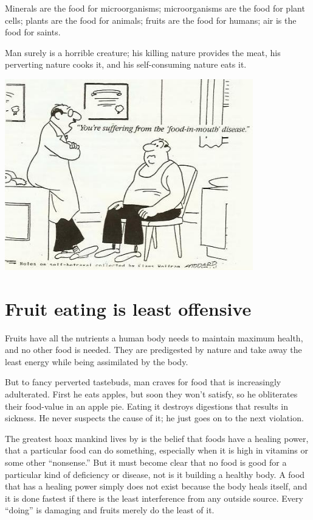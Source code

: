 \documentclass[12pt,letterpaper]{article}
\begin{document}
Minerals are the food for microorganisms; microorganisms are the food
for plant cells; plants are the food for animals; fruits are the food
for humans; air is the food for saints.

Man surely is a horrible creature; his killing nature provides the
meat, his perverting nature cooks it, and his self-consuming nature
eats it.




\includegraphics[width=4.25in,bb=0 0 470 359]{p7.jpg}





\section{Fruit eating is least offensive}

Fruits have all the nutrients a human body needs to maintain maximum
health, and no other food is needed. They are predigested by nature
and take away the least energy while being assimilated by the body.

But to fancy perverted tastebuds, man craves for food that is
increasingly adulterated. First he eats apples, but soon they won't
satisfy, so he obliterates their food-value in an apple pie. Eating it
destroys digestions that results in sickness. He never suspects the
cause of it; he just goes on to the next violation.

The greatest hoax mankind lives by is the belief that foods have a
healing power, that a particular food can do something, especially
when it is high in vitamins or some other ``nonsense.'' But it must
become clear that no food is good for a particular kind of deficiency
or disease, not is it building a healthy body. A food that has a
healing power simply does not exist because the body heals itself, and
it is done fastest if there is the least interference from any outside
source. Every ``doing'' is damaging and fruits merely do the least of
it.
\end{document}
